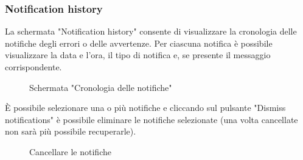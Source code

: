 \subsubsection{Notification history}
La schermata "Notification history" consente di visualizzare la cronologia delle notifiche degli errori o delle avvertenze. Per ciascuna notifica è possibile visualizzare la data e l'ora, il tipo di notifica e, se presente il messaggio corrispondente.
\begin{figure}[H]
    \centering
    \caption{Schermata "Cronologia delle notifiche"}
    \label{fig:my_label}
\end{figure}
È possibile selezionare una o più notifiche e cliccando sul pulsante "Dismiss notifications" è possibile eliminare le notifiche selezionate (una volta cancellate non sarà più possibile recuperarle).  
\begin{figure}[H]
    \centering
    \caption{Cancellare le notifiche}
    \label{fig:my_label}
\end{figure}

